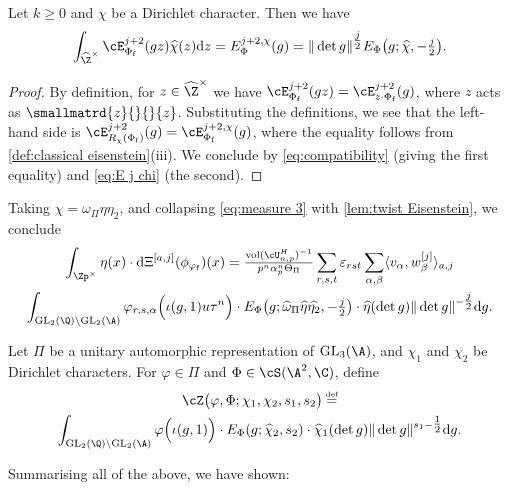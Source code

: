 \documentclass[10pt,reqno,a4paper]{amsart}
\newcommand{\Phif}{{\Phi\subf}}
\newcommand{\chihat}{\widehat{\chi}}
\newcommand{\omegahat}{\widehat{\omega}}
\newcommand{\etahat}{\widehat{\eta}}
\newcommand{\subf}{_{\mathrm{f}}}
\newcommand{\GL}{\mathrm{GL}}
\begin{document}
\begin{lemma}\label{lem:twist Eisenstein}
Let $k \geq 0$ and $\chi$ be a Dirichlet character. Then we have
\[
\int_{\widehat{\Z}^\times} \cE_{\Phif}^{j+2}(gz)\chihat(z)\mathrm{d}z = E_{\Phi}^{j+2,\chi}(g) = \|\det g\|^{\tfrac{j}{2}} E_\Phi\big(g; \chihat, -\tfrac{j}{2}\big).
\]
\end{lemma}
\begin{proof}
By definition, for $z \in \widehat{\Z}^\times$ we have $\cE_{\Phif}^{j+2}(gz) = \cE_{z\cdot \Phif}^{j+2}(g)$, where $z$ acts as $\smallmatrd{z}{}{}{z}$. Substituting the definitions, we see that the left-hand side is $\cE_{R_\chi(\Phif)}^{j+2}(g) = \cE_{\Phif}^{j+2,\chi}(g)$, where the equality follows from \cref{def:classical eisenstein}(iii). We conclude by \eqref{eq:compatibility} (giving the first equality) and \eqref{eq:E j chi} (the second).
\end{proof}

Taking $\chi = \omega_\Pi\eta\eta_2$, and collapsing \eqref{eq:measure 3} with \cref{lem:twist Eisenstein}, we conclude
\begin{multline*}
\int_{\Zp^\times} \eta(x)  \cdot \mathrm{d}\Xi^{[a,j]}(\phi_{\varphi\subf})(x) = \tfrac{\operatorname{vol}(\cU_{n,p}^H)^{-1}}{p^{n}\alpha_{p}^n \Theta_\Pi} \sum_{r,s,t} \varepsilon_{rst} \sum_{\alpha,\beta} \langle v_\alpha, w_\beta^{[j]}\rangle_{a,j}\\
\int_{\GL_2(\Q)\backslash \GL_2(\A)}  \varphi_{r,s,\alpha} \Big(\iota(g,1)u\tau^{n}\Big)
\cdot E_{\Phi}\big(g; \omegahat_\Pi\etahat\widehat{\eta_2}, -\tfrac{j}{2}\big) \cdot  \etahat(\det g) \|\det g\|^{-\tfrac{j}{2}}  \mathrm{d}g.
\end{multline*}



\begin{definition}\label{def:global zeta integral}
Let $\Pi$ be a unitary automorphic representation of $\GL_3(\A)$, and $\chi_1$ and $\chi_2$ be Dirichlet characters. For $\varphi \in \Pi$ and $\Phi \in \cS(\A^2,\C)$, define
\begin{multline*}
	\cZ\big(\varphi, \Phi; \chi_1,\chi_2,s_1,s_2\big) \defeq \\
	\int_{\GL_2(\Q) \backslash \GL_2(\A)} \varphi\Big(\iota(g,1)
	\Big)\cdot E_\Phi(g; \chihat_2, s_2)\cdot \chihat_1(\det g)\|\det g\|^{s_1-\tfrac{1}{2}} \mathrm{d}g.
\end{multline*}
\end{definition}

Summarising all of the above, we have shown:
\end{document}
